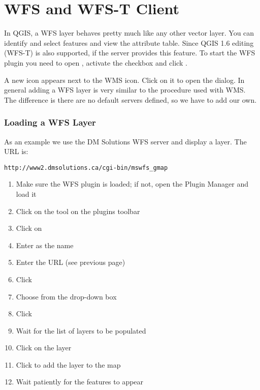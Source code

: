 %
%
\section{WFS and WFS-T Client}\label{sec:ogc-wfs}

In QGIS, a WFS layer behaves pretty much like any other vector layer. You
can identify and select features and view the attribute table. Since QGIS 1.6 
editing (WFS-T) is also supported, if the server provides this feature. To start 
the WFS plugin you need to open  \arrow 
{}, activate the 
 checkbox and click .

A new  icon appears next
to the WMS icon. Click on it to open the dialog. In general adding a WFS
layer is very similar to the procedure used with WMS. The difference is
there are no default servers defined, so we have to add our own.

\subsubsection{Loading a WFS Layer}

As an example we use the DM Solutions WFS server and display a layer. The URL is:
\begin{verbatim}
http://www2.dmsolutions.ca/cgi-bin/mswfs_gmap
\end{verbatim}

\begin{enumerate}
  \item Make sure the WFS plugin is loaded; if not, open the Plugin Manager and load it
  \item Click on the
  tool on the plugins toolbar
  \item Click on 
  \item Enter  as the name
  \item Enter the URL (see previous page)
  \item Click 
  \item Choose  from the drop-down box
  \item Click 
  \item Wait for the list of layers to be populated
  \item Click on the  layer
  \item Click  to add the layer to the map
  \item Wait patiently for the features to appear
\end{enumerate}


